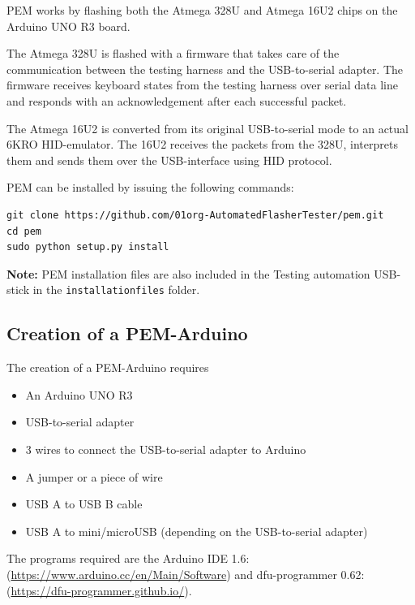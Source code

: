 \documentclass[a4paper,11pt]{article}
\newcommand{\note}{\textbf{Note: }}
\newcommand{\cmd}[1]{\texttt{#1}}
\begin{document}
PEM works by flashing both the Atmega 328U and Atmega 16U2 chips on the Arduino UNO R3 board. 

The Atmega 328U is flashed with a firmware that takes care of the communication between the testing harness and the USB-to-serial adapter. The firmware receives keyboard states from the testing harness over serial data line and responds with an acknowledgement after each successful packet.

The Atmega 16U2 is converted from its original USB-to-serial mode to an actual 6KRO HID-emulator. The 16U2 receives the packets from the 328U, interprets them and sends them over the USB-interface using HID protocol.

PEM can be installed by issuing the following commands:
\begin{lstlisting}
git clone https://github.com/01org-AutomatedFlasherTester/pem.git
cd pem
sudo python setup.py install
\end{lstlisting}
\note{PEM installation files are also included in the Testing automation USB-stick in the \cmd{installationfiles} folder.}

\subsection{Creation of a PEM-Arduino}
\label{pemarduino}
The creation of a PEM-Arduino requires 
\begin{itemize}
\item An Arduino UNO R3
\item USB-to-serial adapter
\item 3 wires to connect the USB-to-serial adapter to Arduino
\item A jumper or a piece of wire
\item USB A to USB B cable
\item USB A to mini/microUSB (depending on the USB-to-serial adapter)
\end{itemize}

The programs required are the Arduino IDE 1.6: (\url{https://www.arduino.cc/en/Main/Software}) and dfu-programmer 0.62: (\url{https://dfu-programmer.github.io/}).
\end{document}
